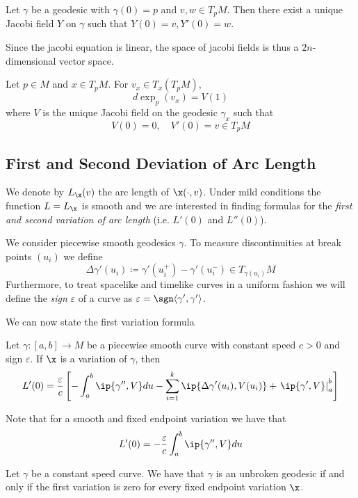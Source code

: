 \begin{lemma}
Let $\gamma$ be a geodesic with $\gamma(0)=p$ and $v,w\in T_pM$. Then there exist a unique Jacobi field $Y$ on $\gamma$ such that $Y(0)=v, Y'(0)=w$.
\end{lemma}
Since the jacobi equation is linear, the space of jacobi fields is thus a $2n$-dimensional vector space.

\begin{proposition}Let $p\in M$ and $x\in T_pM$. For $v_x\in T_x(T_pM)$, 
\[
d \exp_p(v_x) = V(1)
\]
where $V$ is the unique Jacobi field on the geodesic $\gamma_x$ such that
\[
V(0) = 0, \quad V'(0) = v\in T_pM
\]
\end{proposition}

\subsection{First and Second Deviation of Arc Length}
We denote by $L_\x(v)$ the arc length of $\x(\cdot,v)$. Under mild conditions the function $L=L_\x$ is smooth and we are interested in finding formulas for the \emph{first and second variation of arc length} (i.e. $L'(0)$ and $L''(0)$).

We consider piecewise smooth geodesics $\gamma$. To measure discontinuities at break points $(u_i)$ we define 
\[
\Delta\gamma'(u_i)\coloneqq\gamma'(u_i^+)-\gamma'(u_i^-)\in T_{\gamma(u_i)}M
\]
Furthermore, to treat spacelike and timelike curves in a uniform fashion we will define the \emph{sign} $\varepsilon$ of a curve as $\varepsilon=\sgn\langle\gamma',\gamma'\rangle$.

We can now state the first variation formula
\begin{proposition}Let $\gamma:[a,b]\to M$ be a piecewise  smooth curve with constant speed $c>0$ and sign $\varepsilon$. If $\x$ is a variation of $\gamma$, then
\[
L'(0) = \frac{\varepsilon}{c}\left[-\int_a^b\ip{\gamma'',V}du
-\sum_{i=1}^k\ip{\Delta\gamma'(u_i),V(u_i)} + \left.\ip{\gamma',V}\right\rvert_a^b\right]
\]
\end{proposition}
Note that for a smooth and fixed endpoint variation we have that
\[
L'(0) = -\frac{\varepsilon}{c}\int_a^b\ip{\gamma'',V}du
\]

\begin{corollary}\label{cor:geoismax}
Let $\gamma$ be a constant speed curve. We have that $\gamma$ is an unbroken geodesic if and only if the first variation is zero for every fixed endpoint variation $\x$.
\end{corollary}

